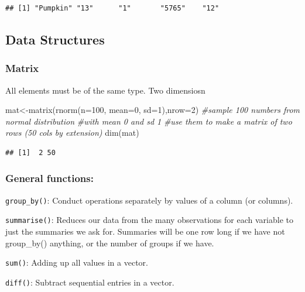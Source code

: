 \documentclass[
]{article}
\newenvironment{Shaded}{\begin{snugshade}}{\end{snugshade}}
\newcommand{\AttributeTok}[1]{\textcolor[rgb]{0.77,0.63,0.00}{#1}}
\newcommand{\CommentTok}[1]{\textcolor[rgb]{0.56,0.35,0.01}{\textit{#1}}}
\newcommand{\DecValTok}[1]{\textcolor[rgb]{0.00,0.00,0.81}{#1}}
\newcommand{\FunctionTok}[1]{\textcolor[rgb]{0.00,0.00,0.00}{#1}}
\newcommand{\NormalTok}[1]{#1}
\newcommand{\OtherTok}[1]{\textcolor[rgb]{0.56,0.35,0.01}{#1}}
\begin{document}
\begin{verbatim}
## [1] "Pumpkin" "13"      "1"       "5765"    "12"
\end{verbatim}

\hypertarget{data-structures-3}{%
\subsection{Data Structures}\label{data-structures-3}}

\hypertarget{matrix}{%
\subsubsection{Matrix}\label{matrix}}

All elements must be of the same type. Two dimensiosn

\begin{Shaded}
\begin{Highlighting}[]
\NormalTok{mat}\OtherTok{\textless{}{-}}\FunctionTok{matrix}\NormalTok{(}\FunctionTok{rnorm}\NormalTok{(}\AttributeTok{n=}\DecValTok{100}\NormalTok{, }\AttributeTok{mean=}\DecValTok{0}\NormalTok{, }\AttributeTok{sd=}\DecValTok{1}\NormalTok{),}\AttributeTok{nrow=}\DecValTok{2}\NormalTok{) }\CommentTok{\#sample 100 numbers from normal distribution}
\CommentTok{\#with mean 0 and sd 1}
\CommentTok{\#use them to make a matrix of two rows (50 cols by extension)}
\FunctionTok{dim}\NormalTok{(mat)}
\end{Highlighting}
\end{Shaded}

\begin{verbatim}
## [1]  2 50
\end{verbatim}

\hypertarget{general-functions}{%
\subsubsection{General functions:}\label{general-functions}}

\texttt{group\_by()}: Conduct operations separately by values of a
column (or columns).

\texttt{summarise()}: Reduces our data from the many observations for
each variable to just the summaries we ask for. Summaries will be one
row long if we have not group\_by() anything, or the number of groups if
we have.

\texttt{sum()}: Adding up all values in a vector.

\texttt{diff()}: Subtract sequential entries in a vector.
\end{document}
